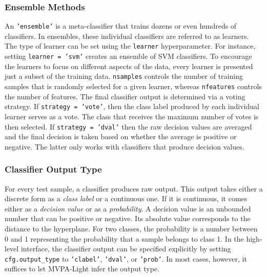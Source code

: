 \documentclass[utf8]{frontiersSCNS} %
\newcommand{\ttt}[1]{\texttt{#1}}
\begin{document}
\subsubsection{Ensemble Methods}

An \ttt{'ensemble'} is a meta-classifier that trains dozens or even hundreds of classifiers. In ensembles, these individual classifiers are referred to as learners. The type of learner can be set using the \ttt{learner} hyperparameter. For instance, setting \ttt{learner = 'svm'} creates an ensemble of SVM classifiers. To encourage the learners to focus on different aspects of the data, every learner is presented just a subset of the training data. \ttt{nsamples} controls the number of training samples that is randomly selected for a given learner, whereas \ttt{nfeatures} controls the number of features.
The final classifier output is determined via a voting strategy. If \ttt{strategy = 'vote'}, then the class label produced by each individual learner serves as a vote. The class that receives the maximum number of votes is then selected. If \ttt{strategy = 'dval'}  then the raw decision values are averaged and the final decision is taken based on whether the average is positive or negative. The latter only works with classifiers that produce decision values. 


\subsubsection{Classifier Output Type}\label{sec:output}

For every test sample, a classifier produces raw output. This output takes either a discrete form as a \textit{class label} or a continuous one. If it is continuous, it comes either as a \textit{decision value} or as a \textit{probability}. A decision value is an unbounded number that can be positive or negative. Its absolute value corresponds to the distance to the hyperplane. For two classes, the probability is a number between 0 and 1 representing the probability that a sample belongs to class 1.
In the high-level interface, the classifier output can be specified explicitly by setting \ttt{cfg.output\_type} to \ttt{'clabel'}, \ttt{'dval'}, or \ttt{'prob'}. In most cases, however, it suffices to let MVPA-Light infer the output type.

\end{document}
